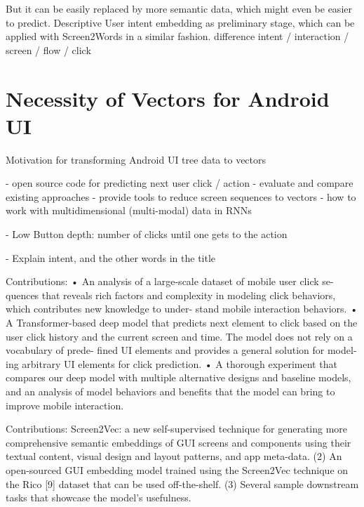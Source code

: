 
But it can be easily replaced by more semantic data, which might even be easier to predict.
Descriptive User intent embedding as preliminary stage, which can be applied with Screen2Words\cite{wang2021screen2words} in a similar fashion.
difference intent / interaction / screen / flow / click


\section{Necessity of Vectors for Android UI}
\label{sec:necessity-of-vectors-for-android-ui}


Motivation for transforming Android UI tree data to vectors

- open source code for predicting next user click / action
- evaluate and compare existing approaches
- provide tools to reduce screen sequences to vectors
- how to work with multidimensional (multi-modal) data in RNNs

- Low Button depth: number of clicks until one gets to the action \cite{lee2018click}

- Explain intent, and the other words in the title

Contributions: \cite{zhou2021large}
• An analysis of a large-scale dataset of mobile user click se-
quences that reveals rich factors and complexity in modeling
click behaviors, which contributes new knowledge to under-
stand mobile interaction behaviors.
• A Transformer-based deep model that predicts next element
to click based on the user click history and the current screen
and time. The model does not rely on a vocabulary of prede-
fined UI elements and provides a general solution for model-
ing arbitrary UI elements for click prediction.
• A thorough experiment that compares our deep model with
multiple alternative designs and baseline models, and an
analysis of model behaviors and benefits that the model can
bring to improve mobile interaction.

Contributions: \cite{li2021screen2vec}
Screen2Vec: a new self-supervised technique for generating
more comprehensive semantic embeddings of GUI screens
and components using their textual content, visual design
and layout patterns, and app meta-data.
(2) An open-sourced GUI embedding model trained using the
Screen2Vec technique on the Rico [9] dataset that can be
used off-the-shelf.
(3) Several sample downstream tasks that showcase the model’s
usefulness.

